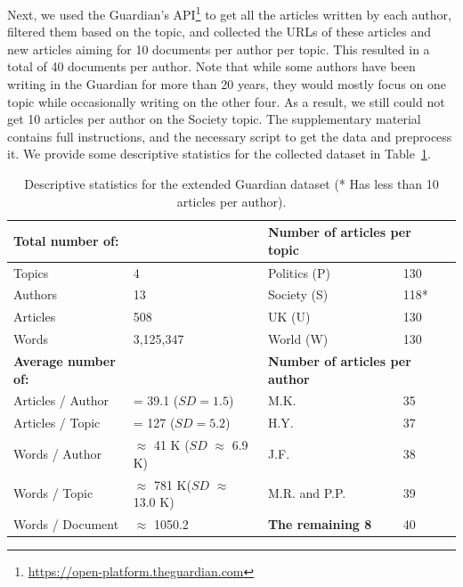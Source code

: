 \documentclass[11pt]{article}
\begin{document}
Next, we used the Guardian's API\footnote{\url{https://open-platform.theguardian.com}} to get all the articles written by each author, filtered them based on the topic, and collected the URLs of these articles and new articles aiming for 10 documents per author per topic. This resulted in a total of 40 documents per author. Note that while some authors have been writing in the Guardian for more than 20 years, they would mostly focus on one topic while occasionally writing on the other four. As a result, we still could not get 10 articles per author on the Society topic. The supplementary material contains full instructions, and the necessary script to get the data and preprocess it. We provide some descriptive statistics for the collected dataset in Table~\ref{tab:myData}. 
\begin{table}[ht]
    \centering
    \begin{tabular}{ll |lll }
    \hline 
    \textbf{Total number of:} & &
    \multicolumn{2}{l}{\textbf{Number of articles per topic}} &
    \\\hline
    \phantom{Hi} Topics     & 4           & \phantom{Hi} Politics (P)  & 130            \\ 
    \phantom{Hi} Authors    & 13          & \phantom{Hi} Society (S)  & 118*          \\  
    \phantom{Hi} Articles   & 508         & \phantom{Hi} UK (U)      & 130           \\
    \phantom{Hi} Words      & 3,125,347   & \phantom{Hi} World (W)   & 130            \\
     \hline
     \textbf{Average number of: } & &
     \multicolumn{2}{l}{\textbf{Number of articles per author}} \\\hline
     \phantom{Hi} Articles / Author   & = 39.1 ($SD=1.5$)                         & \phantom{Hi} M.K.                & 35\\
     \phantom{Hi} Articles / Topic    & = 127 ($SD=5.2$)                          & \phantom{Hi} H.Y.                & 37\\
     \phantom{Hi} Words / Author      & $\approx$ 41 K ($SD$ $\approx$ 6.9 K)   & \phantom{Hi} J.F.                & 38\\
     \phantom{Hi} Words / Topic       & $\approx$ 781 K($SD$ $\approx$ 13.0 K)  & \phantom{Hi} M.R. and P.P.       & 39 \\
     \phantom{Hi} Words / Document    & $\approx$ 1050.2                        & \phantom{Hi} \textbf{The remaining 8}   & 40 \\ \hline
     \end{tabular}
    \caption{Descriptive statistics for the extended Guardian dataset (* Has less than 10 articles per author).}
    \label{tab:myData}
\end{table} 
\end{document}
